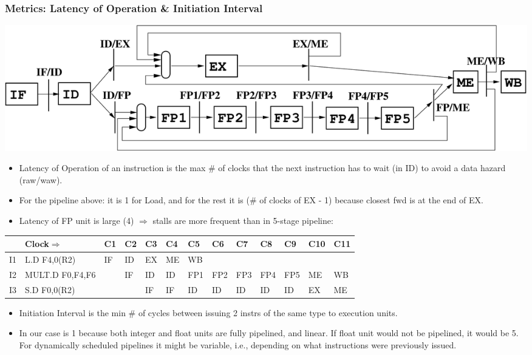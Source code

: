 \documentclass{beamer}
\renewcommand{\emph}[1]{\textcolor{structure}{#1}}
\newcommand{\emp}[1]{\textcolor{DikuRed}{ #1}}
\begin{document}
\begin{frame}[fragile,t]
\frametitle{Metrics: Latency of Operation \& Initiation Interval}

\includegraphics[width=53ex]{Figures/SimpleOoOPipeline}

\bigskip

\begin{scriptsize}
\begin{itemize}
\item \emp{Latency of Operation} of an instruction is the max \# of clocks 
        that the next instruction has to wait (in ID) to avoid a data hazard 
        ({\sc raw}/{\sc waw}).\smallskip
\item For the pipeline above: it is 1 for Load, and for the rest it is 
        (\# of clocks of EX - 1) because closest fwd is at the end of EX. 

\item Latency of FP unit is large (4) $\Rightarrow$ stalls are more frequent than in 5-stage pipeline:
\end{itemize}

\begin{tiny}
\begin{tabular}{lllllllllllll}
\hline
   & Clock$\Rightarrow$ & C1 & C2 & C3 & C4 & C5 & C6 & C7 & C8 & C9 & C10 & C11            \\\hline
I1 & L.D    F4,0(R2)     & IF & ID & EX & ME & \emp{WB} &    &    &    & & &                \\
I2 & MULT.D F0,F4,F6     &    & IF & ID & ID & \emph{FP1} & FP2 & FP3 & FP4 & FP5 & \emp{ME} & WB \\
I3 & S.D    F0,0(R2)     &    &    & IF & IF & ID & ID & ID & ID & ID & \emph{EX} & ME  \\\hline
\end{tabular}
\end{tiny}
\bigskip

\begin{itemize}
\item \emp{Initiation Interval} is the min \# of cycles between issuing 2 instrs
            of the same type to execution units.\smallskip
\item In our case is 1 because both integer and float units are fully pipelined,
        and linear. If float unit would not be pipelined, it would be 5.
      For dynamically scheduled pipelines it might be variable, 
        i.e., depending on what instructions were previously issued.
\end{itemize}
\end{scriptsize}
\end{frame}
\end{document}
